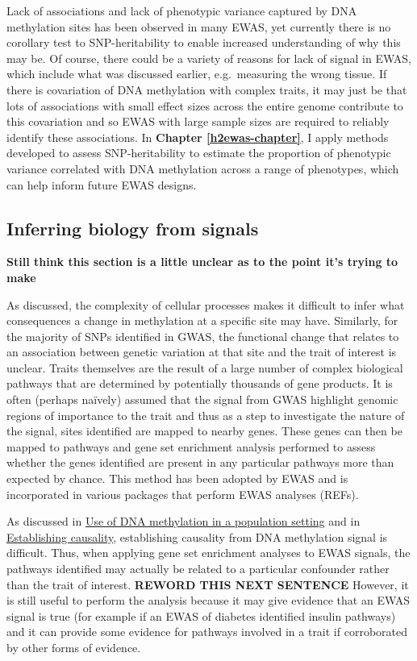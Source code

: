 \documentclass[11pt,twoside]{bristolthesis}
\begin{document}
Lack of associations and lack of phenotypic variance captured by DNA methylation sites has been observed in many EWAS, yet currently there is no corollary test to SNP-heritability to enable increased understanding of why this may be. Of course, there could be a variety of reasons for lack of signal in EWAS, which include what was discussed earlier, e.g.~measuring the wrong tissue. If there is covariation of DNA methylation with complex traits, it may just be that lots of associations with small effect sizes across the entire genome contribute to this covariation and so EWAS with large sample sizes are required to reliably identify these associations. In \textbf{Chapter \ref{h2ewas-chapter}}, I apply methods developed to assess SNP-heritability to estimate the proportion of phenotypic variance correlated with DNA methylation across a range of phenotypes, which can help inform future EWAS designs.

\hypertarget{inferring-biology-from-signals}{%
\subsection{Inferring biology from signals}\label{inferring-biology-from-signals}}

\textbf{Still think this section is a little unclear as to the point it's trying to make}

As discussed, the complexity of cellular processes makes it difficult to infer what consequences a change in methylation at a specific site may have. Similarly, for the majority of SNPs identified in GWAS, the functional change that relates to an association between genetic variation at that site and the trait of interest is unclear. Traits themselves are the result of a large number of complex biological pathways that are determined by potentially thousands of gene products. It is often (perhaps naïvely) assumed that the signal from GWAS highlight genomic regions of importance to the trait and thus as a step to investigate the nature of the signal, sites identified are mapped to nearby genes. These genes can then be mapped to pathways and gene set enrichment analysis performed to assess whether the genes identified are present in any particular pathways more than expected by chance. This method has been adopted by EWAS and is incorporated in various packages that perform EWAS analyses (REFs).

As discussed in \protect\hyperlink{dnam-phs}{Use of DNA methylation in a population setting} and in \protect\hyperlink{establishing-causality}{Establishing causality}, establishing causality from DNA methylation signal is difficult. Thus, when applying gene set enrichment analyses to EWAS signals, the pathways identified may actually be related to a particular confounder rather than the trait of interest. \textbf{REWORD THIS NEXT SENTENCE} However, it is still useful to perform the analysis because it may give evidence that an EWAS signal is true (for example if an EWAS of diabetes identified insulin pathways) and it can provide some evidence for pathways involved in a trait if corroborated by other forms of evidence.
\end{document}
